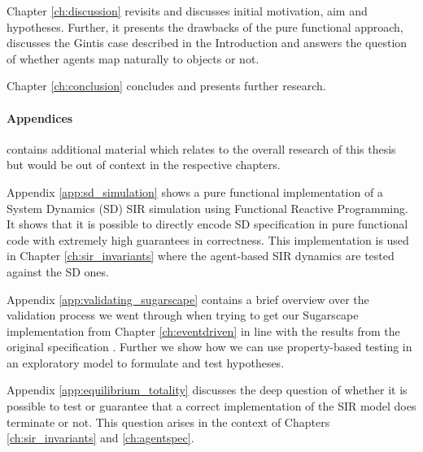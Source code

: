 
Chapter \ref{ch:discussion} revisits and discusses initial motivation, aim and hypotheses. Further, it presents the drawbacks of the pure functional approach, discusses the Gintis case described in the Introduction and answers the question of whether agents map naturally to objects or not.

\medskip

Chapter \ref{ch:conclusion} concludes and presents further research.

\paragraph{Appendices} contains additional material which relates to the overall research of this thesis but would be out of context in the respective chapters.
\medskip

Appendix \ref{app:sd_simulation} shows a pure functional implementation of a System Dynamics (SD) SIR simulation using Functional Reactive Programming. It shows that it is possible to directly encode SD specification in pure functional code with extremely high guarantees in correctness. This implementation is used in Chapter \ref{ch:sir_invariants} where the agent-based SIR dynamics are tested against the SD ones.

\medskip

Appendix \ref{app:validating_sugarscape} contains a brief overview over the validation process we went through when trying to get our Sugarscape implementation from Chapter \ref{ch:eventdriven} in line with the results from the original specification \cite{epstein_growing_1996}. Further we show how we can use property-based testing in an exploratory model to formulate and test hypotheses.

\medskip

Appendix \ref{app:equilibrium_totality} discusses the deep question of whether it is possible to test or guarantee that a correct implementation of the SIR model does terminate or not. This question arises in the context of Chapters \ref{ch:sir_invariants} and \ref{ch:agentspec}.